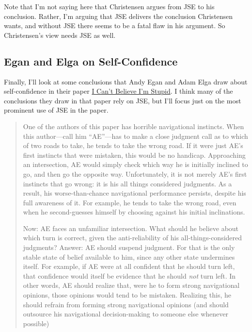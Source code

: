 Note that I'm not saying here that Christensen argues from JSE to his conclusion. Rather, I'm arguing that JSE delivers the conclusion Christensen wants, and without JSE there seems to be a fatal flaw in his argument. So Christensen's view needs JSE as well.

\subsection{Egan and Elga on Self-Confidence}

Finally, I'll look at some conclusions that Andy Egan and Adam Elga draw about self-confidence in their paper \href{http://philsci-archive.pitt.edu/archive/00002432/}{I Can't Believe I'm Stupid}. I think many of the conclusions they draw in that paper rely on JSE, but I'll focus just on the most prominent use of JSE in the paper.

\begin{quote}
One of the authors of this paper has horrible navigational instincts. When this author---call him ``AE''---has to make a close judgment call as to which of two roads to take, he tends to take the wrong road.  If it were just AE's first instincts that were mistaken, this would be no handicap.  Approaching an intersection, AE would simply check which way he is initially inclined to go, and then go the opposite way.  Unfortunately, it is not merely AE's first instincts that go wrong: it is his all things considered judgments.  As a result, his worse-than-chance navigational performance persists, despite his full awareness of it.  For example, he tends to take the wrong road, even when he second-guesses himself by choosing against his initial inclinations.

Now: AE faces an unfamiliar intersection.  What should he believe about which turn is correct, given the anti-reliability of his all-things-considered judgments?  Answer: AE should suspend judgment.  For that is the only stable state of belief available to him, since any other state undermines itself.  For example, if AE were at all confident that he should turn left, that confidence would itself be evidence that he should \textit{not} turn left.  In other words, AE should realize that, were he to form strong navigational opinions, those opinions would tend to be mistaken.  Realizing this, he should refrain from forming strong navigational opinions (and should outsource his navigational decision-making to someone else whenever possible)
\end{quote}

